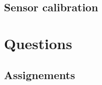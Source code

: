 \subsection{Sensor calibration}
\label{sensor_calibration}
 

\section{Questions}
\label{questions_sensor_fusion}

\subsection{Assignements}
\label{assignements_sensor_fusion}



